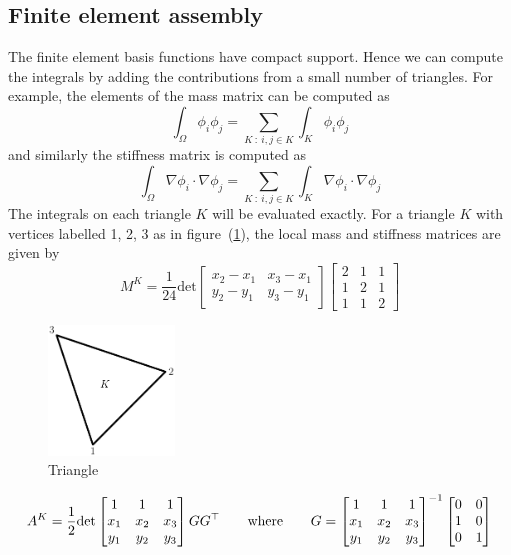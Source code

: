 \documentclass[12pt]{article}
\begin{document}
\subsection{Finite element assembly}
The finite element basis functions have compact support. Hence we can compute the integrals by adding the contributions from a small number of triangles. For example, the elements of the mass matrix can be computed as
\[
\int_\Omega \phi_i \phi_j = \sum_{K \ : \ i, j \in K} \int_K \phi_i \phi_j
\]
and similarly the stiffness matrix is computed as
\[
\int_\Omega \nabla \phi_i \cdot \nabla \phi_j = \sum_{K \ : \ i, j \in K} \int_K \nabla \phi_i \cdot \nabla \phi_j
\]
The integrals on each triangle $K$ will be evaluated exactly. For a triangle $K$ with vertices labelled 1, 2, 3 as in figure~(\ref{fig:tria}), the local mass and stiffness matrices are given by
\[
M^K = \frac{1}{24} \mbox{det}\begin{bmatrix}
x_2 - x_1 & x_3 - x_1 \\
y_2 - y_1 & y_3 - y_1
\end{bmatrix} \begin{bmatrix}
2 & 1 & 1 \\
1 & 2 & 1 \\
1 & 1 & 2
\end{bmatrix}
\]
\begin{figure}
\begin{center}
\includegraphics[width=0.3\textwidth]{tria}
\caption{Triangle}
\label{fig:tria}
\end{center}
\end{figure}
\[
A^K = \frac{1}{2} \mbox{det}\begin{bmatrix}
1 & 1 & 1 \\
x_1 & x_2 & x_3 \\
y_1 & y_2 & y_3
\end{bmatrix} G G^\top \qquad\textrm{where}\qquad G = \begin{bmatrix}
1 &  1 & 1\\
x_1 & x_2 & x_3 \\
y_1 & y_2 & y_3
\end{bmatrix}^{-1} \begin{bmatrix}
0 & 0 \\
1 & 0 \\
0 & 1
\end{bmatrix}
\]
\end{document}
